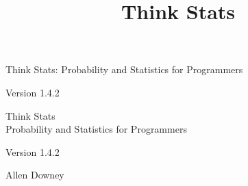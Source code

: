 \documentclass[12pt]{book}
\title{Think Stats}
\newcommand{\theversion}{1.4.2}
\begin{document}
\frontmatter




\newtheorem{ex}{Exercise}[chapter]

\begin{latexonly}

\renewcommand{\blankpage}{\thispagestyle{empty} \quad \newpage}



\thispagestyle{empty}

\begin{flushright}
\vspace*{2.0in}

\begin{spacing}{3}
{\huge Think Stats: Probability and Statistics for Programmers}\\
{\Large }
\end{spacing}

\vspace{0.25in}

Version \theversion

\vfill

\end{flushright}


\blankpage
\blankpage

\pagebreak
\thispagestyle{empty}

\begin{flushright}
\vspace*{2.0in}

\begin{spacing}{3}
{\huge Think Stats}\\
{\Large Probability and Statistics for Programmers}
\end{spacing}

\vspace{0.25in}

Version \theversion

\vspace{1in}


{\Large
Allen Downey\\
}



\end{flushright}
\end{latexonly}
\end{document}
